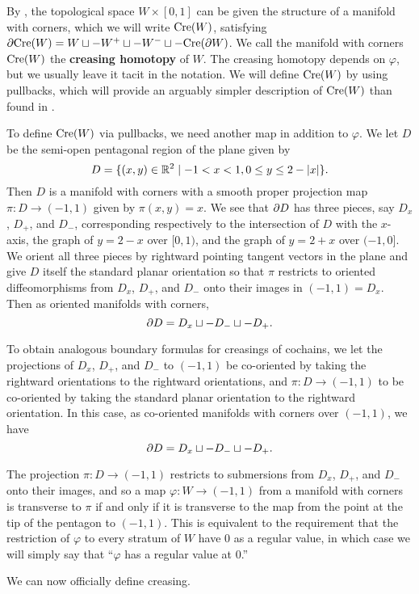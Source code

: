 By \cite[Lemma~9]{Lipy14}, the topological space $W \times [0,1]$ can be given the structure of a manifold with corners, which we will write $\mathrm{Cre}(W)$, satisfying $\partial \mathrm{Cre}(W) = W \sqcup -W^+ \sqcup -W^- \sqcup - \mathrm{Cre}(\partial W)$.
We call the manifold with corners $\mathrm{Cre}(W)$ the \textbf{creasing homotopy} of $W$.
The creasing homotopy depends on $\varphi$, but we usually leave it tacit in the notation.
We will define $\mathrm{Cre}(W)$ by using pullbacks, which will provide an arguably simpler description of $\mathrm{Cre}(W)$ than found in \cite{Lipy14}.

To define $\mathrm{Cre}(W)$ via pullbacks, we need another map in addition to $\varphi$.
We let $D$ be the semi-open pentagonal region of the plane given by
$$D = \{(x,y) \in \mathbb{R}^2 \mid -1<x<1, 0 \leq y \leq 2-|x|\}.$$
Then $D$ is a manifold with corners with a smooth proper projection map $\pi \colon D \to (-1,1)$ given by $\pi(x,y) = x$.
We see that $\partial D$ has three pieces, say $D_x$, $D_+$, and $D_-$, corresponding respectively to the intersection of $D$ with the $x$-axis, the graph of $y = 2-x$ over $[0,1)$, and the graph of $y = 2+x$ over $(-1, 0]$.
We orient all three pieces by rightward pointing tangent vectors in the plane and give $D$ itself the standard planar orientation so that $\pi$ restricts to oriented diffeomorphisms from $D_x$, $D_+$, and $D_-$ onto their images in $(-1,1) = D_x$.
Then as oriented manifolds with corners, $$\partial D = D_x \sqcup -D_- \sqcup -D_+.$$

To obtain analogous boundary formulas for creasings of cochains, we let the projections of $D_x$, $D_+$, and $D_-$ to $(-1,1)$ be co-oriented by taking the rightward orientations to the rightward orientations, and $\pi \colon D \to (-1,1)$ to be co-oriented by taking the standard planar orientation to the rightward orientation.
In this case, as co-oriented manifolds with corners over $(-1,1)$, we have
$$\partial D = D_x \sqcup -D_- \sqcup -D_+.$$

The projection $\pi \colon D \to (-1,1)$ restricts to submersions from $D_x$, $D_+$, and $D_-$ onto their images, and so a map $\varphi \colon W \to (-1,1)$ from a manifold with corners is transverse to $\pi$ if and only if it is transverse to the map from the point at the tip of the pentagon to $(-1,1)$.
This is equivalent to the requirement that the restriction of $\varphi$ to every stratum of $W$ have $0$ as a regular value, in which case we will simply say that ``$\varphi$ has a regular value at $0$.''

We can now officially define creasing.

